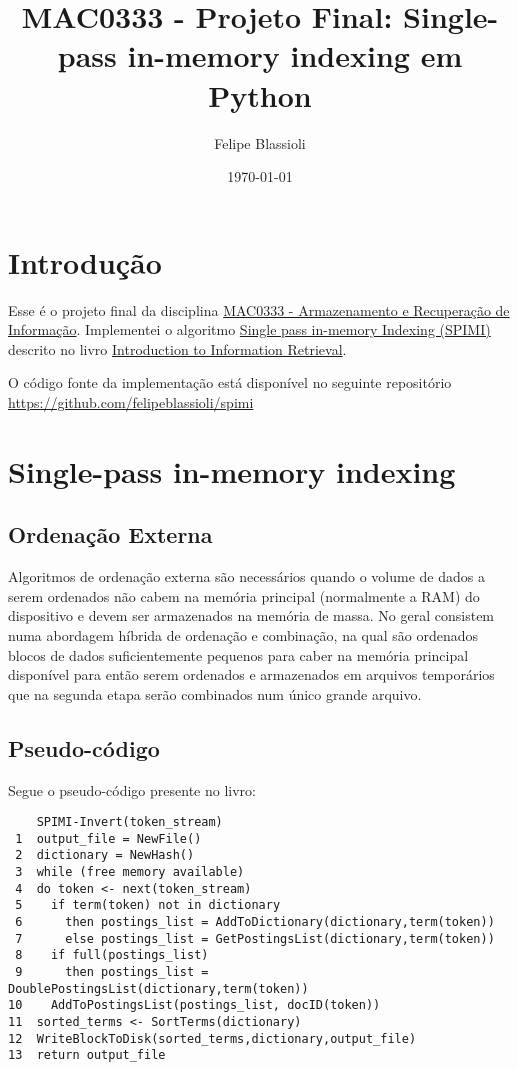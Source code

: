\documentclass[a4paper]{article}
\title{MAC0333 - Projeto Final: Single-pass in-memory indexing em Python}
\author{Felipe Blassioli}
\date{\today}
\begin{document}
\maketitle

\section{Introdução}

Esse é o projeto final da disciplina \href{https://uspdigital.usp.br/jupiterweb/obterDisciplina?sgldis=mac0333&nomdis=}{MAC0333 - Armazenamento e Recuperação de Informação}. Implementei o algoritmo \href{http://nlp.stanford.edu/IR-book/html/htmledition/single-pass-in-memory-indexing-1.html}{Single pass in-memory Indexing (SPIMI)} descrito no livro \href{http://nlp.stanford.edu/IR-book/}{Introduction to Information Retrieval}.

O código fonte da implementação está disponível no seguinte repositório \url{https://github.com/felipeblassioli/spimi}

\section{Single-pass in-memory indexing}

\subsection{Ordenação Externa}

Algoritmos de ordenação externa são necessários quando o volume de dados a serem ordenados não cabem na memória principal (normalmente a RAM) do dispositivo e devem ser armazenados na memória de massa. No geral consistem numa abordagem híbrida de ordenação e combinação, na qual são ordenados blocos de dados suficientemente pequenos para caber na memória principal disponível para então serem ordenados e armazenados em arquivos temporários que na segunda etapa serão combinados num único grande arquivo. 

\subsection{Pseudo-código}

Segue o pseudo-código presente no livro:

\begin{lstlisting}
    SPIMI-Invert(token_stream)
 1  output_file = NewFile()
 2  dictionary = NewHash()
 3  while (free memory available)
 4  do token <- next(token_stream)
 5    if term(token) not in dictionary
 6      then postings_list = AddToDictionary(dictionary,term(token))
 7      else postings_list = GetPostingsList(dictionary,term(token))
 8    if full(postings_list)
 9      then postings_list = DoublePostingsList(dictionary,term(token))
10    AddToPostingsList(postings_list, docID(token))
11  sorted_terms <- SortTerms(dictionary)
12  WriteBlockToDisk(sorted_terms,dictionary,output_file)
13  return output_file
\end{lstlisting}
\end{document}
